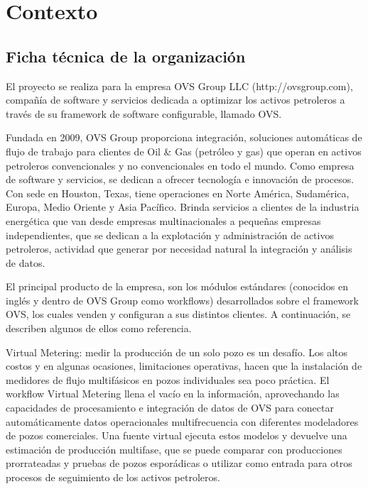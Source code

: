 \chapter{Contexto}
\label{chapter:context}

\section{Ficha técnica de la organización}
\label{section:ficha} El proyecto se realiza para la empresa OVS Group LLC
(http://ovsgroup.com), compañía de software y servicios dedicada a optimizar
los activos petroleros a través de su framework de software configurable,
llamado OVS.

Fundada en 2009, OVS Group proporciona integración, soluciones automáticas de
flujo de trabajo para clientes de Oil \& Gas (petróleo y gas) que operan en
activos petroleros convencionales y no convencionales en todo el mundo. Como
empresa de software y servicios, se dedican a ofrecer tecnología e innovación
de procesos. Con sede en Houston, Texas, tiene operaciones en Norte América,
Sudamérica, Europa, Medio Oriente y Asia Pacífico. Brinda servicios a clientes
de la industria energética que van desde empresas multinacionales a pequeñas
empresas independientes, que se dedican a la explotación y administración de
activos petroleros, actividad que generar por necesidad natural la integración
y análisis de datos.

El principal producto de la empresa, son los módulos estándares (conocidos en
inglés y dentro de OVS Group como workflows) desarrollados sobre el framework
OVS, los cuales venden y configuran a sus distintos clientes. A continuación,
se describen algunos de ellos como referencia.

Virtual Metering: medir la producción de un solo pozo es un desafío. Los altos
costos y en algunas ocasiones, limitaciones operativas, hacen que la
instalación de medidores de flujo multifásicos en pozos individuales sea poco
práctica. El workflow Virtual Metering llena el vacío en la información,
aprovechando las capacidades de procesamiento e integración de datos de OVS
para conectar automáticamente datos operacionales multifrecuencia con
diferentes modeladores de pozos comerciales. Una fuente virtual ejecuta estos
modelos y devuelve una estimación de producción multifase, que se puede
comparar con producciones prorrateadas y pruebas de pozos esporádicas o
utilizar como entrada para otros procesos de seguimiento de los activos
petroleros.

